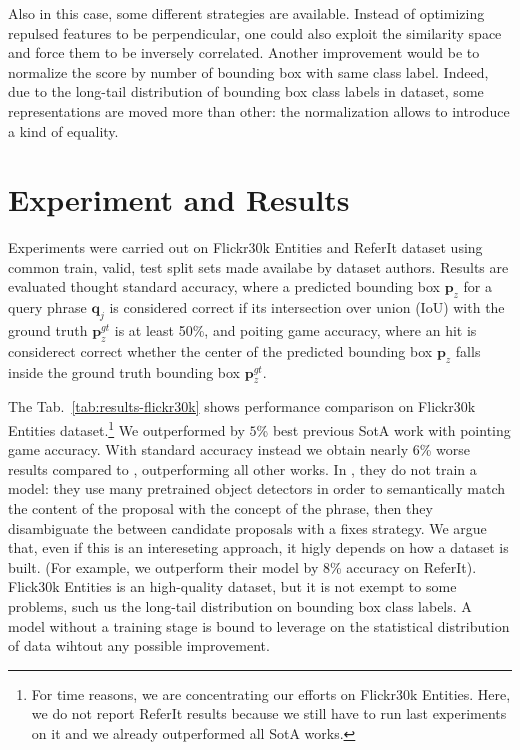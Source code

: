 \documentclass{article}
\begin{document}
Also in this case, some different strategies are available. Instead of
optimizing repulsed features to be perpendicular, one could also
exploit the similarity space and force them to be inversely
correlated. Another improvement would be to normalize the score by
number of bounding box with same class label. Indeed, due to the
long-tail distribution of bounding box class labels in dataset, some
representations are moved more than other: the normalization allows to
introduce a kind of equality.

\section{Experiment and Results}

Experiments were carried out on Flickr30k Entities and ReferIt dataset
using common train, valid, test split sets made availabe by dataset
authors. Results are evaluated thought standard accuracy, where a
predicted bounding box $\bm{p}_z$ for a query phrase $\bm{q}_j$ is
considered correct if its intersection over union (IoU) with the
ground truth $\bm{p}^{gt}_z$ is at least 50\%, and poiting game
accuracy, where an hit is considerect correct whether the center of
the predicted bounding box $\bm{p}_z$ falls inside the ground truth
bounding box $\bm{p}^{gt}_z$.

The Tab.~\ref{tab:results-flickr30k} shows performance comparison on Flickr30k
Entities dataset.\footnote{For time reasons, we are concentrating our
efforts on Flickr30k Entities. Here, we do not report ReferIt results
because we still have to run last experiments on it and we already
outperformed all SotA works.} We outperformed by $5$\% best previous
SotA work with pointing game accuracy. With standard accuracy instead
we obtain nearly $6$\% worse results compared to
\cite{wang2019phrase}, outperforming all other works. In
\cite{wang2019phrase}, they do not train a model: they use many
pretrained object detectors in order to semantically match the content
of the proposal with the concept of the phrase, then they disambiguate
the between candidate proposals with a fixes strategy. We argue that,
even if this is an intereseting approach, it higly depends on how a
dataset is built. (For example, we outperform their model by $8$\%
accuracy on ReferIt). Flick30k Entities is an high-quality dataset,
but it is not exempt to some problems, such us the long-tail
distribution on bounding box class labels. A model without a training
stage is bound to leverage on the statistical distribution of data
wihtout any possible improvement.
\end{document}
